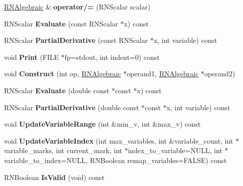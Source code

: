 \begin{DoxyCompactItemize}
\item 
\hyperlink{class_r_n_algebraic}{R\+N\+Algebraic} \& {\bfseries operator/=} (R\+N\+Scalar scalar)\hypertarget{class_r_n_algebraic_a2d87336bd13eab6cdd5495a6d21b1887}{}\label{class_r_n_algebraic_a2d87336bd13eab6cdd5495a6d21b1887}

\item 
R\+N\+Scalar {\bfseries Evaluate} (const R\+N\+Scalar $\ast$x) const \hypertarget{class_r_n_algebraic_a4946d9041fb461baf892cfe3ff92c2ab}{}\label{class_r_n_algebraic_a4946d9041fb461baf892cfe3ff92c2ab}

\item 
R\+N\+Scalar {\bfseries Partial\+Derivative} (const R\+N\+Scalar $\ast$x, int variable) const \hypertarget{class_r_n_algebraic_a2f4e50b1df6386e9d43ec9a2d0d05674}{}\label{class_r_n_algebraic_a2f4e50b1df6386e9d43ec9a2d0d05674}

\item 
void {\bfseries Print} (F\+I\+LE $\ast$fp=stdout, int indent=0) const \hypertarget{class_r_n_algebraic_aada36b2ee5b8aa090e88782093d1de3b}{}\label{class_r_n_algebraic_aada36b2ee5b8aa090e88782093d1de3b}

\item 
void {\bfseries Construct} (int op, \hyperlink{class_r_n_algebraic}{R\+N\+Algebraic} $\ast$operand1, \hyperlink{class_r_n_algebraic}{R\+N\+Algebraic} $\ast$operand2)\hypertarget{class_r_n_algebraic_ace589aadb3dfef27791d5d3775e2586a}{}\label{class_r_n_algebraic_ace589aadb3dfef27791d5d3775e2586a}

\item 
R\+N\+Scalar {\bfseries Evaluate} (double const $\ast$const $\ast$x) const \hypertarget{class_r_n_algebraic_ae1a5b21cf97272ceed88a13fd9262657}{}\label{class_r_n_algebraic_ae1a5b21cf97272ceed88a13fd9262657}

\item 
R\+N\+Scalar {\bfseries Partial\+Derivative} (double const $\ast$const $\ast$x, int variable) const \hypertarget{class_r_n_algebraic_aa24ae468a2575d4ee238d3a54ee040aa}{}\label{class_r_n_algebraic_aa24ae468a2575d4ee238d3a54ee040aa}

\item 
void {\bfseries Update\+Variable\+Range} (int \&min\+\_\+v, int \&max\+\_\+v) const \hypertarget{class_r_n_algebraic_a57fbc698dbd1b7d434bcb7e21c4c9158}{}\label{class_r_n_algebraic_a57fbc698dbd1b7d434bcb7e21c4c9158}

\item 
void {\bfseries Update\+Variable\+Index} (int max\+\_\+variables, int \&variable\+\_\+count, int $\ast$variable\+\_\+marks, int current\+\_\+mark, int $\ast$index\+\_\+to\+\_\+variable=N\+U\+LL, int $\ast$variable\+\_\+to\+\_\+index=N\+U\+LL, R\+N\+Boolean remap\+\_\+variables=F\+A\+L\+SE) const \hypertarget{class_r_n_algebraic_a3f8c5b0a2aa029bd15182866b7ff2acc}{}\label{class_r_n_algebraic_a3f8c5b0a2aa029bd15182866b7ff2acc}

\item 
R\+N\+Boolean {\bfseries Is\+Valid} (void) const \hypertarget{class_r_n_algebraic_a3113773da228ba036dea21d07e59eab3}{}\label{class_r_n_algebraic_a3113773da228ba036dea21d07e59eab3}

\end{DoxyCompactItemize}
